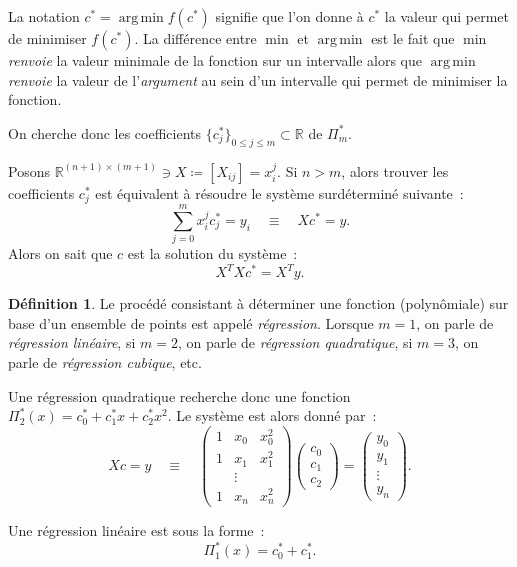 \documentclass{article}
\theoremstyle{definition}
\newtheorem{déf}[thm]{Définition}
\theoremstyle{remark}
\DeclareMathOperator*{\argmin}{arg\,min}  %
\newcommand{\R}{\mathbb R}
\begin{document}
		La notation $c^* = \argmin f(c^*)$ signifie que l'on donne à $c^*$ la valeur qui permet de minimiser $f(c^*)$. La différence entre $\min$ et $\argmin$
		est le fait que $\min$ \emph{renvoie} la valeur minimale de la fonction sur un intervalle alors que $\argmin$ \emph{renvoie} la valeur de
		l'\emph{argument} au sein d'un intervalle qui permet de minimiser la fonction.

		On cherche donc les coefficients $\{c_j^*\}_{0 \leq j \leq m} \subset \R$ de $\Pi_m^*$.

		Posons $\R^{(n+1) \times (m+1)} \ni X \coloneqq [X_{ij}] = x_i^j$. Si $n > m$, alors trouver les coefficients $c_j^*$ est équivalent à résoudre le système
		surdéterminé suivante~:
		\[\sum_{j=0}^mx_i^jc_j^* = y_i \quad \equiv \quad Xc^* = y.\]
		Alors on sait que $c$ est la solution du système~:
		\[X^TXc^* = X^Ty.\]

		\begin{déf} Le procédé consistant à déterminer une fonction (polynômiale) sur base d'un ensemble de points est appelé \emph{régression}. Lorsque $m=1$,
		on parle de \emph{régression linéaire}, si $m=2$, on parle de \emph{régression quadratique}, si $m=3$, on parle de \emph{régression cubique}, etc.
		\end{déf}

		Une régression quadratique recherche donc une fonction $\Pi_2^*(x) = c_0^* + c_1^*x + c_2^*x^2$. Le système est alors donné par~:
		\[
			Xc = y\quad\equiv\quad
			\begin{pmatrix}
				1 & x_0 & x_0^2 \\
				1 & x_1 & x_1^2 \\
				  &  \vdots & \\
				1 & x_n & x_n^2
			\end{pmatrix}
			\begin{pmatrix} c_0 \\ c_1 \\ c_2 \end{pmatrix}
			=
			\begin{pmatrix}y_0 \\ y_1 \\ \vdots \\ y_n\end{pmatrix}.
		\]

		Une régression linéaire est sous la forme~:
		\[\Pi_1^*(x) = c_0^* + c_1^*.\]
\end{document}
